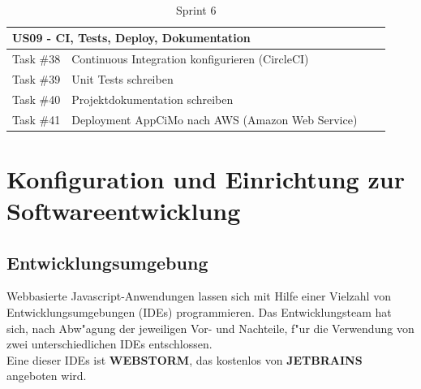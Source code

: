 \documentclass[a4paper, 11pt]{scrreprt}
\begin{document}
\begin{table}[H]

\caption{Sprint 6}

\ \\

\par

\label{tab:Sprint 6}

\centering

\begin{tabular}{|p{2.5cm} p{12cm}| ll}

\hline
\multicolumn{2}{|l|}{US09 - CI, Tests, Deploy, Dokumentation} \\

\hline
Task \#38 & Continuous Integration konfigurieren (CircleCI)\\

\hline
Task \#39 & Unit Tests schreiben\\

\hline
Task \#40 & Projektdokumentation schreiben\\

\hline
Task \#41 & Deployment AppCiMo nach AWS (Amazon Web Service)\\

\hline
\end{tabular}

\end{table}

\chapter{Konfiguration und Einrichtung zur Softwareentwicklung}

\section{Entwicklungsumgebung}
Webbasierte Javascript-Anwendungen lassen sich mit Hilfe einer Vielzahl von Entwicklungsumgebungen (IDEs) programmieren.
Das Entwicklungsteam hat sich, nach Abw"agung der jeweiligen Vor- und Nachteile, f"ur die Verwendung von zwei unterschiedlichen IDEs entschlossen.\\

Eine dieser IDEs ist \textbf{WEBSTORM}, das kostenlos von \textbf{JETBRAINS} angeboten wird. \\
\end{document}

